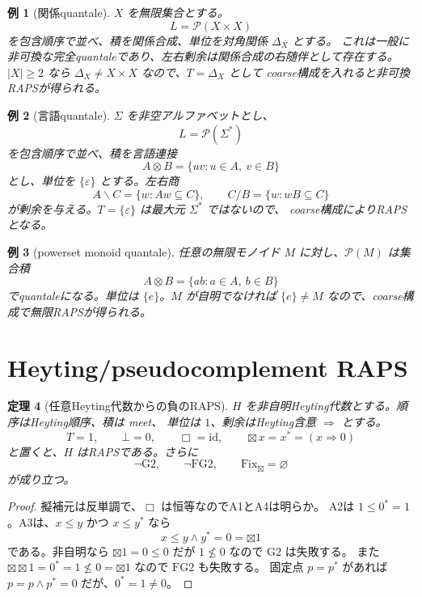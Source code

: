 \documentclass[uplatex,dvipdfmx,a4paper,10pt]{jsarticle}
\newtheorem{theorem}{定理}
\newtheorem{example}[theorem]{例}
\newcommand{\Gtwo}{\mathrm{G2}}
\newcommand{\FGtwo}{\mathrm{FG2}}
\newcommand{\Fix}{\mathrm{Fix}}
\newcommand{\bt}{\boxtimes}
\newcommand{\resl}{\backslash}
\newcommand{\resr}{/}
\newcommand{\Pow}{\mathcal P}
\begin{document}
\begin{example}[関係quantale]
\(X\) を無限集合とする。
\[
L=\Pow(X\times X)
\]
を包含順序で並べ、積を関係合成、単位を対角関係 \(\Delta_X\) とする。
これは一般に非可換な完全quantaleであり、左右剰余は関係合成の右随伴として存在する。
\(|X|\ge2\) なら \(\Delta_X\ne X\times X\) なので、\(T=\Delta_X\) として
coarse構成を入れると非可換RAPSが得られる。
\end{example}

\begin{example}[言語quantale]
\(\Sigma\) を非空アルファベットとし、
\[
L=\Pow(\Sigma^\ast)
\]
を包含順序で並べ、積を言語連接
\[
A\otimes B=\{uv:u\in A,\ v\in B\}
\]
とし、単位を \(\{\varepsilon\}\) とする。左右商
\[
A\resl C=\{w:Aw\subseteq C\},\qquad C\resr B=\{w:wB\subseteq C\}
\]
が剰余を与える。\(T=\{\varepsilon\}\) は最大元 \(\Sigma^\ast\) ではないので、
coarse構成によりRAPSとなる。
\end{example}

\begin{example}[powerset monoid quantale]
任意の無限モノイド \(M\) に対し、\(\Pow(M)\) は集合積
\[
A\otimes B=\{ab:a\in A,\ b\in B\}
\]
でquantaleになる。単位は \(\{e\}\)。\(M\) が自明でなければ
\(\{e\}\ne M\) なので、coarse構成で無限RAPSが得られる。
\end{example}

\section{Heyting/pseudocomplement RAPS}

\begin{theorem}[任意Heyting代数からの負のRAPS]
\(H\) を非自明Heyting代数とする。順序はHeyting順序、積は meet、
単位は \(1\)、剰余はHeyting含意 \(\Rightarrow\) とする。
\[
T=1,\qquad \bot=0,\qquad \Box=\mathrm{id},\qquad
\bt x=x^\ast=(x\Rightarrow0)
\]
と置くと、\(H\) はRAPSである。さらに
\[
\neg\Gtwo,\qquad \neg\FGtwo,\qquad \Fix_{\bt}=\varnothing
\]
が成り立つ。
\end{theorem}

\begin{proof}
擬補元は反単調で、\(\Box\) は恒等なのでA1とA4は明らか。
A2は \(1\le0^\ast=1\)。A3は、\(x\le y\) かつ \(x\le y^\ast\) なら
\[
x\le y\wedge y^\ast=0=\bt1
\]
である。非自明なら \(\bt1=0\le0\) だが \(1\not\le0\) なので \(\Gtwo\) は失敗する。
また \(\bt\bt1=0^\ast=1\not\le0=\bt1\) なので \(\FGtwo\) も失敗する。
固定点 \(p=p^\ast\) があれば \(p=p\wedge p^\ast=0\) だが、\(0^\ast=1\ne0\)。
\end{proof}
\end{document}
